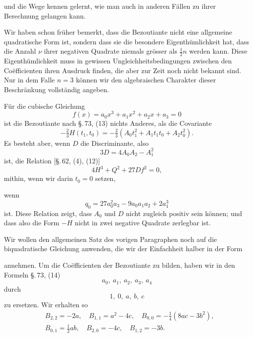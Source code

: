 
und die Wege kennen gelernt, wie man auch in anderen Fällen zu ihrer Berechnung gelangen kann.

Wir haben schon früher bemerkt, dass die Bezoutiante nicht eine allgemeine quadratische Form ist, sondern dass sie die besondere Eigenthümlichkeit hat, dass die Anzahl $\nu$ ihrer negativen Quadrate niemals grösser als $\frac{1}{2}n$ werden kann. Diese Eigenthümlichkeit muss in gewissen Ungleichheitsbedingungen zwischen den Co\"efficienten ihren Ausdruck finden, die aber zur Zeit noch nicht bekannt sind. Nur in dem Falle $n = 3$ können wir den algebraischen Charakter dieser Beschränkung vollständig angeben.

Für die cubische Gleichung
\[
f(x) = a_0 x^3 + a_1 x^2 + a_2 x + a_3 = 0
\]
ist die Bezoutiante nach \S.\,73, (13) nichts Anderes, als die  Covariante
\[
-\tfrac{2}{3} H(t_1, t_0) = -\tfrac{2}{3}(A_0 t_1^2 + A_1 t_1 t_0 + A_2 t_0^2).
\]
Es besteht aber, wenn $D$ die Discriminante, also
\[
3D = 4A_0 A_2 - A_1^2
\]
ist, die Relation [\S.\,62, (4), (12)]
\[
4H^3 + Q^2 + 27Df^2 = 0,
\]
mithin, wenn wir darin $t_0 = 0$ setzen,


wenn
\[
q_0 = 27a_0^2 a_3 - 9a_0 a_1 a_2 + 2a_1^3
\]
ist. Diese Relation zeigt, dass $A_0$ und $D$ nicht zugleich positiv sein können; und dass also die Form $-H$ nicht in zwei negative Quadrate zerlegbar ist.

Wir wollen den allgemeinen Satz des vorigen Paragraphen noch auf die biquadratische Gleichung anwenden, die wir der Einfachheit halber in der Form


annehmen. Um die Co\"efficienten der Bezoutiante zu bilden, haben wir in den Formeln \S.\,73, (14)
\[
a_0,\ a_1,\ a_2,\ a_3,\ a_4
\]
durch
\[
1,\ 0,\ a,\ b,\ c
\]
zu ersetzen. Wir erhalten so
\[
\begin{aligned}
&B_{2,2} = -2a, \quad B_{1,1} = a^2 - 4c, \quad B_{0,0} = -\tfrac{1}{4}(8ac - 3b^2), \\
&B_{0,1} = \tfrac{1}{2}ab, \quad B_{2,0} = -4c, \quad B_{1,2} = -3b.
\end{aligned}
\]
